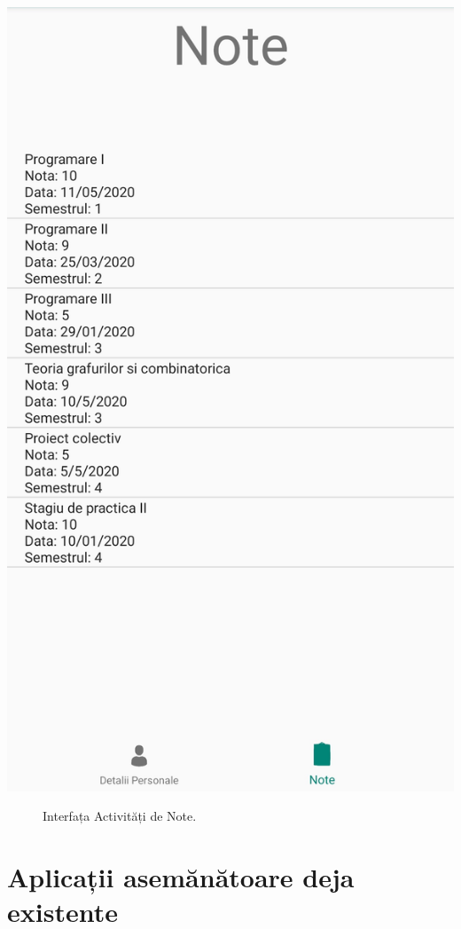\documentclass{article}
\begin{document}
	\begin{center}
		\includegraphics[scale=0.15]{Source/UVTNote}
		\begin{figure}[!h]
			{\caption*{Interfața Activități de Note.}}
		\end{figure}
	\end{center}

	\newpage
	\section{Aplicații asemănătoare deja existente}
\end{document}
